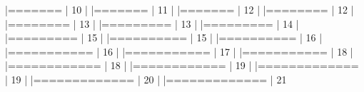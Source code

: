 \documentclass[10pt]{article}
\newenvironment{CodeChunk}{}{}
\begin{document}
\begin{CodeChunk}
\begin{CodeChunk}
\begin{CodeOutput}
  |=======                                                          |  10%
  |                                                                       
  |=======                                                          |  11%
  |                                                                       
  |=======                                                          |  12%
  |                                                                       
  |========                                                         |  12%
  |                                                                       
  |========                                                         |  13%
  |                                                                       
  |=========                                                        |  13%
  |                                                                       
  |=========                                                        |  14%
  |                                                                       
  |=========                                                        |  15%
  |                                                                       
  |==========                                                       |  15%
  |                                                                       
  |==========                                                       |  16%
  |                                                                       
  |===========                                                      |  16%
  |                                                                       
  |===========                                                      |  17%
  |                                                                       
  |===========                                                      |  18%
  |                                                                       
  |============                                                     |  18%
  |                                                                       
  |============                                                     |  19%
  |                                                                       
  |=============                                                    |  19%
  |                                                                       
  |=============                                                    |  20%
  |                                                                       
  |=============                                                    |  21%

\end{CodeOutput}
\end{CodeChunk}
\end{CodeChunk}
\end{document}

